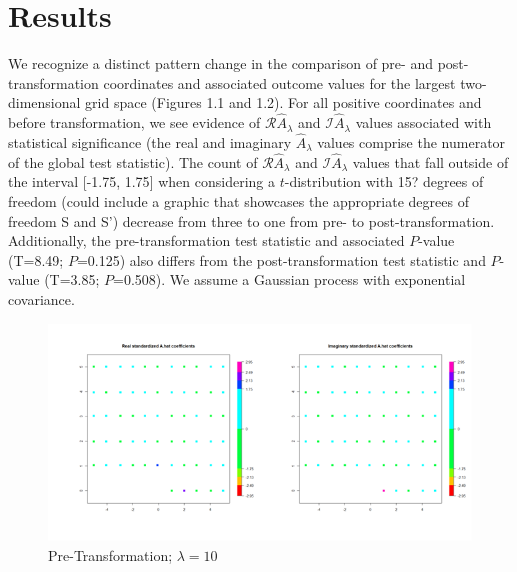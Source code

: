 \documentclass[print]{nuthesis}
\begin{document}
\hypertarget{results}{%
\section{Results}\label{results}}

We recognize a distinct pattern change in the comparison of pre- and post-transformation coordinates and associated outcome values for the largest two-dimensional grid space (Figures 1.1 and 1.2). For all positive coordinates and before transformation, we see evidence of \(\mathscr{R} \hat{A}_\lambda\) and \(\mathscr{I} \hat{A}_\lambda\) values associated with statistical significance (the real and imaginary \(\hat{A}_\lambda\) values comprise the numerator of the global test statistic). The count of \(\mathscr{R} \hat{A}_\lambda\) and \(\mathscr{I} \hat{A}_\lambda\) values that fall outside of the interval {[}-1.75, 1.75{]} when considering a \(t\)-distribution with 15? degrees of freedom (could include a graphic that showcases the appropriate degrees of freedom S and S') decrease from three to one from pre- to post-transformation. Additionally, the pre-transformation test statistic and associated \(P\)-value (T=8.49; \(P\)=0.125) also differs from the post-transformation test statistic and \(P\)-value (T=3.85; \(P\)=0.508). We assume a Gaussian process with exponential covariance.

\begin{figure}[tbp]

{\centering \includegraphics[width=\linewidth,]{figure/Stationarity_Apre_l10_k10} 

}

\caption{Pre-Transformation; $\lambda=10$}\label{fig:unnamed-chunk-1}
\end{figure}
\end{document}
